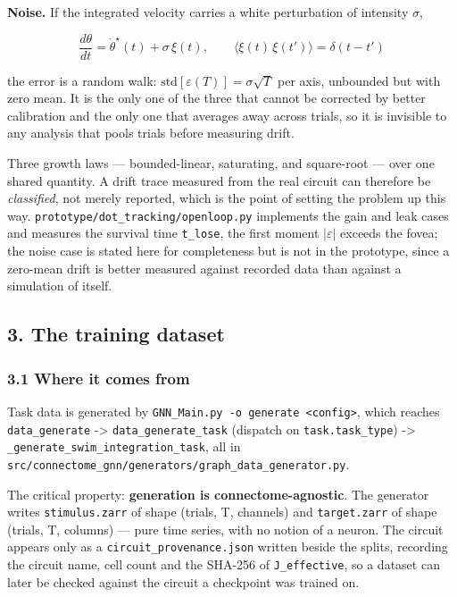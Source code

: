 \documentclass[10pt]{article}
\begin{document}
\textbf{Noise.} If the integrated velocity carries a white perturbation of intensity
$\sigma$,

\begin{equation}
\label{eq:noise-error}
\frac{d\theta}{dt} = \dot\theta^{\star}(t) + \sigma\,\xi(t),
\qquad \langle \xi(t)\,\xi(t')\rangle = \delta(t-t')
\end{equation}

the error is a random walk: $\mathrm{std}[\varepsilon(T)] = \sigma\sqrt{T}$ per axis,
unbounded but with zero mean. It is the only one of the three that cannot be corrected by
better calibration and the only one that averages away across trials, so it is invisible to
any analysis that pools trials before measuring drift.

Three growth laws --- bounded-linear, saturating, and square-root --- over one shared
quantity. A drift trace measured from the real circuit can therefore be \emph{classified},
not merely reported, which is the point of setting the problem up this way.
\texttt{prototype/dot\_tracking/openloop.py} implements the gain and leak cases and measures
the survival time \texttt{t\_lose}, the first moment $|\varepsilon|$ exceeds the fovea; the
noise case is stated here for completeness but is not in the prototype, since a zero-mean
drift is better measured against recorded data than against a simulation of itself.

\subsection*{3. The training dataset}

\subsubsection*{3.1 Where it comes from}

Task data is generated by \texttt{GNN\_Main.py -o generate <config>}, which reaches
\texttt{data\_generate} -> \texttt{data\_generate\_task} (dispatch on
\texttt{task.task\_type}) -> \texttt{\_generate\_swim\_integration\_task}, all in
\texttt{src/connectome\_gnn/generators/graph\_data\_generator.py}.

The critical property: \textbf{generation is connectome-agnostic}. The generator writes
\texttt{stimulus.zarr} of shape (trials, T, channels) and \texttt{target.zarr} of shape
(trials, T, columns) --- pure time series, with no notion of a neuron. The circuit appears
only as a \texttt{circuit\_provenance.json} written beside the splits, recording the circuit
name, cell count and the SHA-256 of \texttt{J\_effective}, so a dataset can later be checked
against the circuit a checkpoint was trained on.
\end{document}

